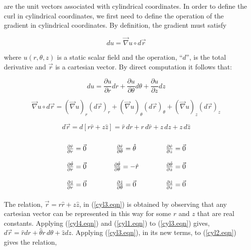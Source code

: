 \documentclass[12pt]{article}
\theoremstyle{definition}
\numberwithin{equation}{section}
\begin{document}
are the unit vectors associated with cylindrical coordinates. In order to define the curl in cylindrical coordinates, we first need to define the operation of the gradient in cylindrical coordinates. By definition, the gradient must satisfy

\begin{equation}
du=\vec{\nabla}u\circ d\vec{r}
\label{gradient2.eqn}
\end{equation} 

where $u(r,\theta ,z)$ is a static scalar field and the operation, \enquote{$d$}, is the total derivative and $\vec{r}$ is a cartesian vector. By direct computation it follows that:

\begin{equation}
du=\frac{\partial u}{\partial r}dr+\frac{\partial u}{\partial \theta}d\theta+\frac{\partial u}{\partial z}dz
\label{cyl1.eqn}
\end{equation}

\begin{equation}
\vec{\nabla}u\circ d\vec{r}=(\vec{\nabla}u)_{r}(d\vec{r})_{r}+(\vec{\nabla}u)_{\theta}(d\vec{r})_{\theta}+(\vec{\nabla}u)_{z}(d\vec{r})_{z}
\label{cyl2.eqn}
\end{equation}

\begin{equation}
d\vec{r}=d[r\hat{r}+z\hat{z}]=\hat{r}\,dr+r\,d\hat{r}+\hat{z}\,dz+z\,d\hat{z}
\label{cyl3.eqn}
\end{equation}

\begin{equation}
\arraycolsep=20pt\def\arraystretch{2.2}
\begin{array}{ccc}\frac{\partial\hat{r}}{\partial r}=\vec{0} & \frac{\partial\hat{r}}{\partial\theta}=\hat{\theta} & \frac{\partial\hat{r}}{\partial z}=\vec{0}\\ \frac{\partial\hat{\theta}}{\partial r}=\vec{0} & \frac{\partial\hat{\theta}}{\partial\theta}=-\hat{r} & \frac{\partial\hat{\theta}}{\partial z}=\vec{0}\\ \frac{\partial\hat{z}}{\partial r}=\vec{0} & \frac{\partial\hat{z}}{\partial\theta}=\vec{0} & \frac{\partial\hat{z}}{\partial z}=\vec{0}\end{array}
\label{cyl4.eqn}
\end{equation}

The relation, $\vec{r}=r\hat{r}+z\hat{z}$, in (\ref{cyl3.eqn}) is obtained by observing that any cartesian vector can be represented in this way for some $r$ and $z$ that are real constants. Applying (\ref{cyl4.eqn}) and (\ref{cyl1.eqn}) to (\ref{cyl3.eqn}) gives, $d\vec{r}=\hat{r}dr+\hat{\theta}r\,d\theta+\hat{z}dz$. Applying (\ref{cyl3.eqn}), in its new terms, to (\ref{cyl2.eqn}) gives the relation,
\end{document}
